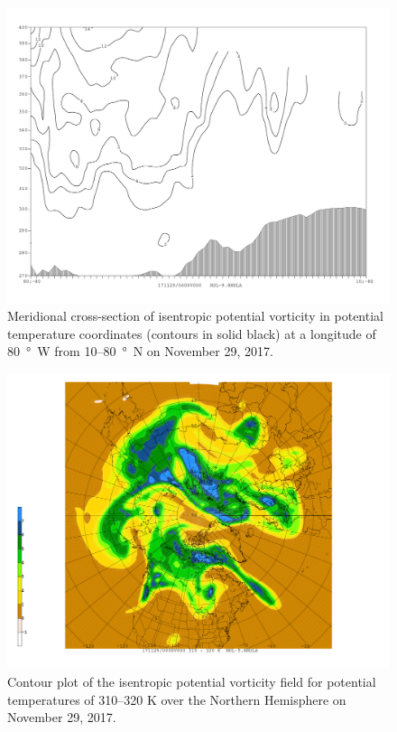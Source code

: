\documentclass[11pt]{article}
\begin{document}
\begin{figure}[h!]
	\centering
	\includegraphics[width=\textwidth]{ipv_thta_coord_50N_zon_xsec_6Z_clearer_tropopause} %
	\caption{Meridional cross-section of isentropic potential vorticity in potential temperature coordinates (contours in solid black) at a longitude of \SI{80}{\degree W} from 10--\SI{80}{\degree N} on November 29, 2017.}
	\label{fig:ipv_thta_coord_50N_zon_xsec_6Z}
\end{figure}

\begin{figure}[h!]
	\centering
	\includegraphics[width=\textwidth,trim={0cm 1cm 4cm 0.5cm},clip]{ipv_north_hemisphere_0Z}
	\caption{Contour plot of the isentropic potential vorticity field for potential temperatures of 310--320 K over the Northern Hemisphere on November 29, 2017.}
	\label{fig:ipv_north_hemisphere_0Z}
\end{figure}
\end{document}

